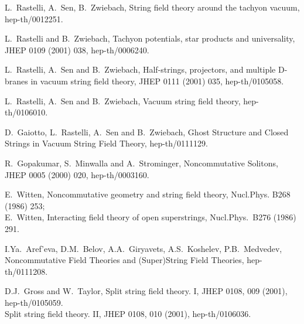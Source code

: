 \documentclass[a4paper,12pt]{article}
\begin{document}
{\small
\begin{thebibliography}{99}




 L.~Rastelli, A.~Sen, B.~Zwiebach,
\textsf{String field theory  around the tachyon vacuum},
hep-th/0012251.

 L.~Rastelli and B.~Zwiebach,
\textsf{Tachyon potentials, star products and universality}, JHEP
0109 (2001) 038, hep-th/0006240.

 L.~Rastelli, A.~Sen and B.~Zwiebach,
\textsf{Half-strings, projectors, and multiple D-branes in vacuum
string field theory}, JHEP 0111 (2001) 035, hep-th/0105058.

 L.~Rastelli, A.~Sen and B.~Zwiebach,
\textsf{Vacuum string field theory}, hep-th/0106010.

 D.~Gaiotto, L.~Rastelli, A.~Sen and B.~Zwiebach,
\textsf{Ghost Structure and Closed Strings in Vacuum String Field
Theory}, hep-th/0111129.


 R.~Gopakumar, S.~Minwalla and A.~Strominger,
\textsf{Noncommutative Solitons}, JHEP 0005 (2000) 020,
hep-th/0003160.


 E.~Witten,
\textsf{Noncommutative geometry and string field theory},
Nucl.Phys. B268 (1986) 253;
\\
E.~Witten, \textsf{Interacting field theory of open superstrings},
Nucl.Phys.~B276 (1986) 291.


 I.Ya.~Aref'eva, D.M.~Belov, A.A.~Giryavets, A.S.~Koshelev,
P.B.~Medvedev, \textsf{Noncommutative Field Theories and
(Super)String Field Theories}, hep-th/0111208.



 D.J.~Gross and W.~Taylor,
\textsf{Split string field theory. I}, JHEP 0108, 009 (2001),
hep-th/0105059.
\\
\textsf{Split string field theory. II}, JHEP 0108, 010 (2001),
hep-th/0106036.


\end{thebibliography}}
\end{document}
